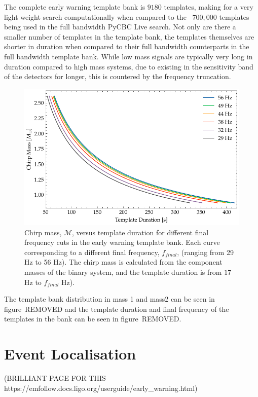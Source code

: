 The complete early warning template bank is $9180$ templates, making for a very light weight search computationally when compared to the ~$700,000$ templates being used in the full bandwidth PyCBC Live search. Not only are there a smaller number of templates in the template bank, the templates themselves are shorter in duration when compared to their full bandwidth counterparts in the full bandwidth template bank. While low mass signals are typically very long in duration compared to high mass systems, due to existing in the sensitivity band of the detectors for longer, this is countered by the frequency truncation.
%
\begin{figure}
    \centering
    \includegraphics[width=\textwidth]{images/6_earlywarning/search/template_bank_mchirp_duration.pdf}
    \caption{Chirp mass, $\mathcal{M}$, versus template duration for different final frequency cuts in the early warning template bank. Each curve corresponding to a different final frequency, $f_{final}$, (ranging from 29 Hz to 56 Hz). The chirp mass is calculated from the component masses of the binary system, and the template duration is from $17$ Hz to $f_{final}$ Hz).}
    \label{6:fig:tb_mchirp_duration}
\end{figure}
%
The template bank distribution in mass 1 and mass2 can be seen in figure~REMOVED and the template duration and final frequency of the templates in the bank can be seen in figure~REMOVED.

\section{Event Localisation}

(BRILLIANT PAGE FOR THIS https://emfollow.docs.ligo.org/userguide/early\_warning.html)


